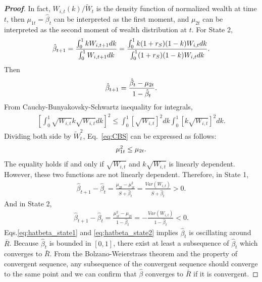 \documentclass[11pt,a4paper]{article}
\begin{document}
\begin{proof}[\textbf{Proof}]
		In fact, $W_{i,t}(k)/\widetilde{W}_t$ is the density function of normalized wealth at time $t$, then $\mu_{1t}=\hat\beta_t$ can be interpreted as the first moment, and $\mu_{2t}$ can be interpreted as the second moment of wealth distribution at $t$.
		For State 2, 
		\begin{eqnarray}%
			\hat\beta_{t+1} = \frac{\int_0^1 kW_{i,t+1}dk}{\int_0^1 W_{i,t+1}dk}
			=\frac{\int_0^1 k(1+r_S)(1-k)W_{i,t}dk}{\int_0^1(1+r_S)(1-k)W_{i,t}dk}.\notag
		\end{eqnarray}
		Then 
		\begin{gather}
			\hat\beta_{t+1} = \frac{ \hat\beta_t - \mu_{2t}}{1-\hat\beta_t}.\notag
		\end{gather}
		From Cauchy-Bunyakovsky-Schwartz inequality for integrals, 
		\begin{eqnarray}\label{eq:CBS}
			\left[\int_0^1 \sqrt{W_{i,t}} k\sqrt{W_{i,t}}dk\right]^2 \le \int_0^1 \left[\sqrt{W_{i,t}}\right]^2 dk \int_0^1 \left[k\sqrt{W_{i,t}}\right]^2 dk.
		\end{eqnarray}
		Dividing both side by $\widetilde W_t^2$, Eq.~\eqref{eq:CBS} can be expressed as follows:
		\begin{eqnarray}
			\mu_{1t}^2 \le \mu_{2t}.\notag
		\end{eqnarray}
		The equality holds if and only if $\sqrt{W_{i,t}}$ and $k\sqrt{W_{i,t}}$ is linearly dependent. However, these two functions are not linearly dependent. Therefore, in State 1, 
		\begin{eqnarray}\label{eq:hatbeta_state1}
			\hat\beta_{t+1}-\hat\beta_{t} = \frac{\mu_{2t}-\mu_{1t}^2}{S+\hat\beta_t} = \frac{Var(W_{i,t})}{S+\hat\beta_t} > 0.
		\end{eqnarray}
		And in State 2,
		\begin{eqnarray}\label{eq:hatbeta_state2}
			\hat\beta_{t+1}-\hat\beta_{t} = \frac{\mu_{1t}^2 - \mu_{2t}}{1-\hat\beta_t} =-\frac{Var(W_{i,t})}{1-\hat\beta_t} < 0.
		\end{eqnarray}
		Eqs.\eqref{eq:hatbeta_state1} and \eqref{eq:hatbeta_state2} implies $\hat\beta_t$ is oscillating around $\bar R$. Because $\hat\beta_t$ is bounded in $[0,1]$, there exist at least a subsequence of $\hat\beta_t$ which converges to $\bar R$. From the Bolzano-Weierstrass theorem and the property of convergent sequence, any subsequence of the convergent sequence should converge to the same point and we can confirm that $\hat\beta$ converges to $\bar R$ if it is convergent. 
	\end{proof}
\end{document}
